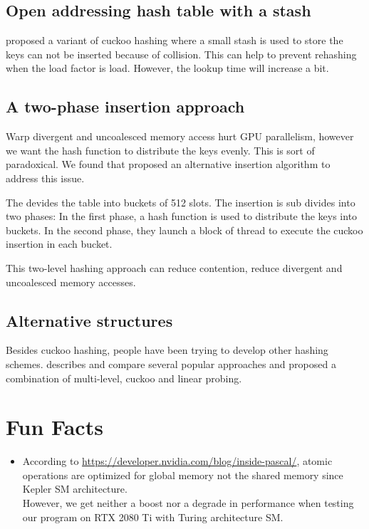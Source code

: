 \documentclass{article}
\newcommand{\reportSection}[1]{
   \pagebreak
   \section{#1}
   \chead{section \emph{#1}}
}
\begin{document}
\subsection{Open addressing hash table with a stash}

{}\cite{paper:stashtable} proposed a variant of cuckoo hashing where a small stash is used to store the keys can not be inserted because of collision.
This can help to prevent rehashing when the load factor is load. However, the lookup time will increase a bit.

\subsection{A two-phase insertion approach}

Warp divergent and uncoalesced memory access hurt GPU parallelism, however we want the hash function to distribute the keys evenly.
This is sort of paradoxical. We found that {}\cite{paper:rtparahashgpu} proposed an alternative insertion algorithm to address this issue.\par
The devides the table into buckets of 512 slots.
The insertion is sub divides into two phases:
In the first phase, a hash function is used to distribute the keys into buckets.
In the second phase, they launch a block of thread to execute the cuckoo insertion in each bucket.\par
This two-level hashing approach can reduce contention, reduce divergent and uncoalesced memory accesses.

\subsection{Alternative structures}

Besides cuckoo hashing, people have been trying to develop other hashing schemes.
{}\cite{talk:evalparahash} describes and compare several popular approaches
and proposed a combination of multi-level, cuckoo and linear probing.

\appendix

\reportSection{Fun Facts}
\begin{itemize}
	\item According to \url{https://developer.nvidia.com/blog/inside-pascal/}, atomic operations are optimized for global memory not the shared memory since Kepler SM architecture.\\
	      However, we get neither a boost nor a degrade in performance when testing our program on RTX 2080 Ti with Turing architecture SM.
\end{itemize}

\printbibliography[
	heading=bibintoc,
	title={reference}
]
\end{document}

